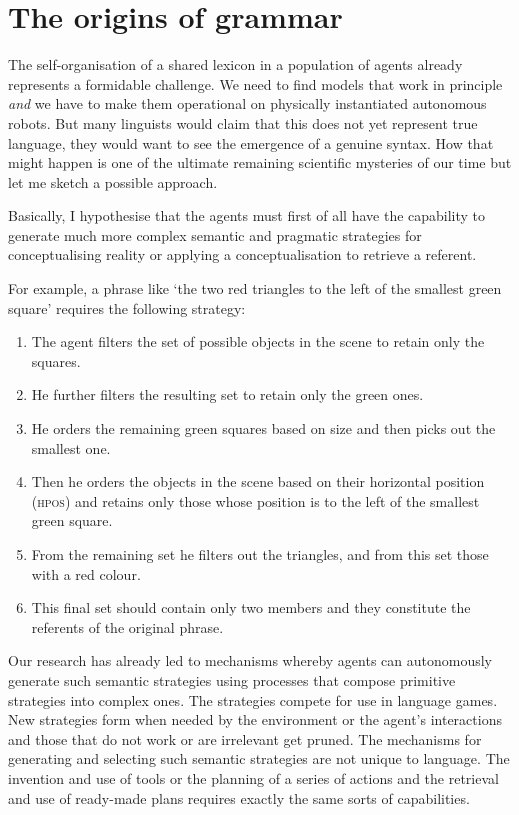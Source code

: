\section{The origins of grammar}

The self-organisation of a shared lexicon in a population
of agents already represents a formidable challenge.
We need to find models that work in principle {\itshape and} 
we have to make them operational on physically 
instantiated autonomous robots. 
But many linguists would claim that this does not yet 
represent true language, they would want to see the 
emergence of a genuine syntax. How that might
happen is one of the ultimate remaining scientific
mysteries of our time but let me sketch a possible approach. 

Basically, I hypothesise that the agents must 
first of all have the capability to generate much 
more complex semantic and pragmatic strategies for conceptualising
reality or applying a conceptualisation to retrieve 
a referent.

For example, a phrase like `the two red
triangles to the left of the smallest green square' requires
the following strategy: 
\begin{enumerate}
\item The agent filters the set of possible objects in 
the scene to retain only the squares. 
\item He further filters the resulting set to retain only 
the green ones. 
\item He orders the remaining green squares based on 
size and then picks out the smallest one. 
\item Then he orders the objects in the scene based on 
their horizontal position (\textsc{hpos}) and retains only those
whose position is to the left of the smallest green square. 
\item From the remaining set he filters out the triangles, 
and from this set those with a red colour. 
\item This final set should contain only two members
and they constitute the referents of the original phrase. 
\end{enumerate}
Our research has already led to  
mechanisms whereby agents can autonomously generate such
semantic strategies using processes that compose
primitive strategies into complex ones. The
strategies compete for use in language games. 
New strategies form when needed by the environment or 
the agent's interactions and those that do not work or 
are irrelevant get pruned. The mechanisms for generating 
and selecting such semantic strategies are not unique
to language. The invention and use of tools or the 
planning of a series of actions and the retrieval 
and use of ready-made plans requires exactly the 
same sorts of capabilities. 

